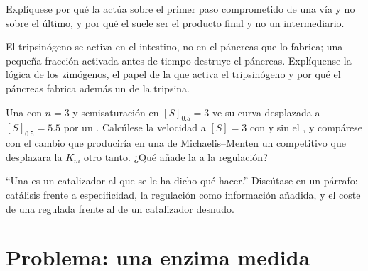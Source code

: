 \begin{exercise}[$\star\star$]\label{exo:b1:enzymes:9}
Explíquese por qué la  actúa sobre el primer
paso comprometido de una vía y no sobre el último, y por qué el 
suele ser el producto final y no un intermediario.
\end{exercise}

\begin{exercise}[$\star\star\star$]\label{exo:b1:enzymes:10}
El tripsinógeno se activa en el intestino, no en el páncreas que lo fabrica;
una pequeña fracción activada antes de tiempo destruye el páncreas.
Explíquense la lógica de los zimógenos, el papel de la  que activa el
tripsinógeno y por qué el páncreas fabrica además un  de la
tripsina.
\end{exercise}

\begin{exercise}[$\star\star\star$]\label{exo:b1:enzymes:11}
Una  con $n = 3$ y semisaturación en
$[S]_{0.5}
= 3$ ve su curva desplazada a $[S]_{0.5} = 5.5$ por un .
Calcúlese la velocidad a $[S] = 3$ con y sin el , y compárese con
el cambio que produciría en una  de Michaelis--Menten un 
competitivo que desplazara la $K_m$ otro tanto. ¿Qué añade la 
a la regulación?
\end{exercise}

\begin{exercise}[$\star\star\star$]\label{exo:b1:enzymes:12}
``Una  es un catalizador al que se le ha dicho qué hacer.'' Discútase
en un párrafo: catálisis frente a especificidad, la regulación como
información añadida, y el coste de una  regulada frente al de un
catalizador desnudo.
\end{exercise}

\section{Problema: una enzima medida}

